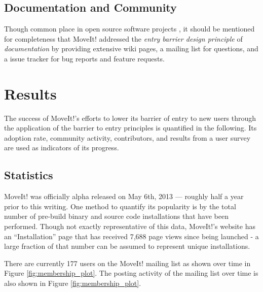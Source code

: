 \documentclass[10pt,journal,compsoc]{joser1}
\begin{document}
{%
\subsection{Documentation and Community}

Though common place in open source software projects \cite{bruyninckx2001open}, it should be mentioned for completeness that MoveIt! addressed the \textit{entry barrier design principle} of \textit{documentation} by providing extensive wiki pages, a mailing list for questions, and a issue tracker for bug reports and feature requests.

\section{Results}
\label{sec::results}

The success of MoveIt!'s efforts to lower its barrier of entry to new users through the application of the barrier to entry principles is quantified in the following. Its adoption rate, community activity, contributors, and results from a user survey are used as indicators of its progress.

\subsection{Statistics}
\label{sec::statistics}

MoveIt! was officially alpha released on May 6th, 2013 --- roughly half a year prior to this writing. One method to quantify its popularity is by the total number of pre-build binary and source code installations that have been performed. Though not exactly representative of this data, MoveIt!'s website has an ``Installation'' page that has received 7,688 page views since being launched \cite{moveit} - a large fraction of that number can be assumed to represent unique installations. 

There are currently 177 users on the MoveIt! mailing list as shown over time in Figure \ref{fig:membership_plot}. The posting activity of the mailing list over time is also shown in Figure \ref{fig:membership_plot}.

}
\end{document}
